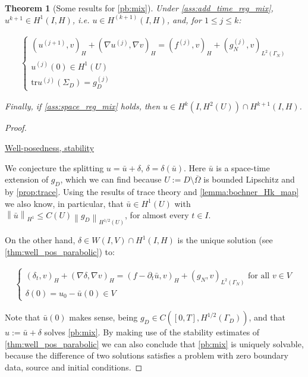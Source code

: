 \documentclass[english,a4paper,9pt,oneside]{scrbook}	%
\theoremstyle{break}
\newtheorem{thm}[equation]{Theorem}
\newenvironment{mproof}[1][\proofname]{%
  \begin{proof}[#1]$ $\par\nobreak\ignorespaces
}{%
  \end{proof}
}
\renewcommand*{\proofname}{Proof}
\theoremstyle{remark}
\newcommand{\norm}[1]{\left\lVert#1\right\rVert}
\newcommand{\tr}{\text{tr}}
\begin{document}
\begin{appendices}
\begin{thm}[Some results for \cref{pb:mix}]


Under \cref{ass:add_time_reg_mix}, $u^{k+1} \in H^1(I,H)$, i.e. $u \in H^{(k+1)}(I,H)$, and, for $1\leq j \leq k$:

\begin{align*}
	\left\{\begin{matrix}
(u^{(j+1)},v)_H + (\nabla u^{(j)}, \nabla v)_H = ( f^{(j)}, v)_H + (g_N^{(j)}, v)_{L^2(\Gamma_N)} \\
u^{(j)}(0)  \in H^1(U) \\
\tr u^{(j)}(\Sigma_D) = g_D^{(j)}
\end{matrix}\right.
\end{align*}


Finally, if \cref{ass:space_reg_mix} holds, then $u \in H^{k}(I,H^2(U)) \cap H^{k+1}(I,H)$.

\end{thm}

\begin{mproof}

\underline{Well-posedness, stability}

We conjecture the splitting $u=\bar{u} + \delta$, $\delta = \delta (\bar{u})$. Here $\bar{u}$ is a space-time extension of $g_D$, which we can find because $U:=D\setminus \overline{\Omega}$ is bounded Lipschitz and by \cref{prop:trace}.
Using the results of trace theory and \cref{lemma:bochner_Hk_map} we also know, in particular, that $\bar{u} \in H^1(U)$ with $\norm{\bar{u}}_{H^1}\leq C(U) \norm{g_D}_{H^{1/2}(U)}$, for almost every $t \in I$.

On the other hand, $\delta \in W(I,V) \cap H^1(I,H)$ is the unique solution (see \cref{thm:well_pos_parabolic}) to:

\begin{align}
\label{pb:diri_ext}
\left\{\begin{matrix}
(\delta_t,v)_H + (\nabla \delta, \nabla v)_H = (f - \partial_t \bar{u},v)_H + (g_N,v)_{L^2(\Gamma_N)} \text{ for all } v \in V\\ 
\delta(0) = u_0 - \bar{u}(0) \in V
\end{matrix}\right.
\end{align}

Note that $\bar{u}(0)$ makes sense, being $g_D \in C([0,T], H^{1/2}(\Gamma_D))$, and that $u:=\bar{u} + \delta$ solves \cref{pb:mix}. By making use of the stability estimates of \cref{thm:well_pos_parabolic} we can also conclude that \cref{pb:mix} is uniquely solvable, because the difference of two solutions satisfies a problem with zero boundary data, source and initial conditions.


\end{mproof}
\end{appendices}
\end{document}
